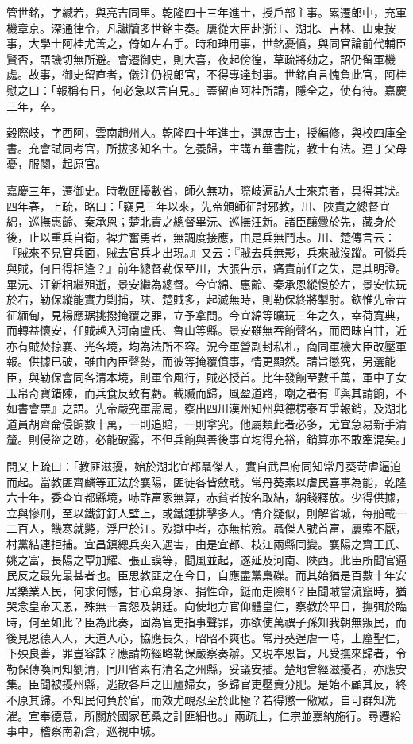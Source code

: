 \begin{pinyinscope}
管世銘，字緘若，與亮吉同里。乾隆四十三年進士，授戶部主事。累遷郎中，充軍機章京。深通律令，凡讞牘多世銘主奏。屢從大臣赴浙江、湖北、吉林、山東按事，大學士阿桂尤善之，倚如左右手。時和珅用事，世銘憂憤，與同官論前代輔臣賢否，語譏切無所避。會遷御史，則大喜，夜起傍徨，草疏將劾之，詔仍留軍機處。故事，御史留直者，儀注仍視郎官，不得專達封事。世銘自言愧負此官，阿桂慰之曰：「報稱有日，何必急以言自見。」蓋留直阿桂所請，隱全之，使有待。嘉慶三年，卒。

穀際岐，字西阿，雲南趙州人。乾隆四十年進士，選庶吉士，授編修，與校四庫全書。充會試同考官，所拔多知名士。乞養歸，主講五華書院，教士有法。連丁父母憂，服闋，起原官。

嘉慶三年，遷御史。時教匪擾數省，師久無功，際岐遍訪人士來京者，具得其狀。四年春，上疏，略曰：「竊見三年以來，先帝頒師征討邪教，川、陜責之總督宜綿，巡撫惠齡、秦承恩；楚北責之總督畢沅、巡撫汪新。諸臣釀釁於先，藏身於後，止以重兵自衛，裨弁奮勇者，無調度接應，由是兵無鬥志。川、楚傳言云：『賊來不見官兵面，賊去官兵才出現。』又云：『賊去兵無影，兵來賊沒蹤。可憐兵與賊，何日得相逢？』前年總督勒保至川，大張告示，痛責前任之失，是其明證。畢沅、汪新相繼殂逝，景安繼為總督。今宜綿、惠齡、秦承恩縱慢於左，景安怯玩於右，勒保縱能實力剿捕，陜、楚賊多，起滅無時，則勒保終將掣肘。欽惟先帝昔征緬甸，見楊應琚挑撥掩覆之罪，立予拿問。今宜綿等曠玩三年之久，幸荷寬典，而轉益懷安，任賊越入河南盧氏、魯山等縣。景安雖無吞餉聲名，而罔昧自甘，近亦有賊焚掠襄、光各境，均為法所不容。況今軍營副封私札，商同軍機大臣改壓軍報。供據已破，雖由內臣聲勢，而彼等掩覆僨事，情更顯然。請旨懲究，另選能臣，與勒保會同各清本境，則軍令風行，賊必授首。比年發餉至數千萬，軍中子女玉帛奇寶錯陳，而兵食反致有虧。載贓而歸，風盈道路，嘲之者有『與其請餉，不如書會票』之語。先帝嚴究軍需局，察出四川漢州知州與德楞泰互爭報銷，及湖北道員胡齊侖侵餉數十萬，一則追賠，一則拿究。他屬類此者必多，尤宜急易新手清釐。則侵盜之跡，必能破露，不但兵餉與善後事宜均得充裕，銷算亦不敢牽混矣。」

間又上疏曰：「教匪滋擾，始於湖北宜都聶傑人，實自武昌府同知常丹葵苛虐逼迫而起。當教匪齊麟等正法於襄陽，匪徒各皆斂戢。常丹葵素以虐民喜事為能，乾隆六十年，委查宜都縣境，哧詐富家無算，赤貧者按名取結，納錢釋放。少得供據，立與慘刑，至以鐵釘釘人壁上，或鐵錘排擊多人。情介疑似，則解省城，每船載一二百人，饑寒就斃，浮尸於江。歿獄中者，亦無棺殮。聶傑人號首富，屢索不厭，村黨結連拒捕。宜昌鎮總兵突入遇害，由是宜都、枝江兩縣同變。襄陽之齊王氏、姚之富，長陽之覃加耀、張正謨等，聞風並起，遂延及河南、陜西。此臣所聞官逼民反之最先最甚者也。臣思教匪之在今日，自應盡黨梟磔。而其始猶是百數十年安居樂業人民，何求何憾，甘心棄身家、捐性命，鋌而走險耶？臣聞賊當流竄時，猶哭念皇帝天恩，殊無一言怨及朝廷。向使地方官仰體皇仁，察教於平日，撫弭於臨時，何至如此？臣為此奏，固為官吏指事聲罪，亦欲使萬禩子孫知我朝無叛民，而後見恩德入人，天道人心，協應長久，昭昭不爽也。常丹葵逞虐一時，上廑聖仁，下殃良善，罪豈容誅？應請飭經略勒保嚴察奏辦。又現奉恩旨，凡受撫來歸者，令勒保傳喚同知劉清，同川省素有清名之州縣，妥議安插。楚地曾經滋擾者，亦應安集。臣聞被擾州縣，逃散各戶之田廬婦女，多歸官吏壓賣分肥。是始不顧其反，終不原其歸。不知民何負於官，而效尤靦忍至於此極？若得懲一儆眾，自可群知洗濯。宣奉德意，所關於國家苞桑之計匪細也。」兩疏上，仁宗並嘉納施行。尋遷給事中，稽察南新倉，巡視中城。


\end{pinyinscope}

